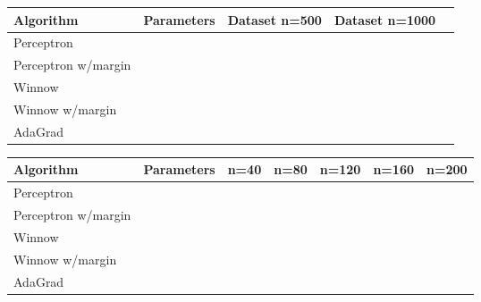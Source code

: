 
\usepackage{amsmath,amssymb,url,color,multirow,array}
\sloppy
\newcommand{\ignore}[1]{}

\oddsidemargin 0in
\evensidemargin 0in
\textwidth 6.5in
\topmargin -0.5in
\textheight 9.0in




  \begin{center}
    \begin{tabular}{|p{3.0cm}|p{2.2cm}|p{2.5cm}|p{2.5cm}|p{2.5cm}|}
      \hline
      Algorithm               &  Parameters & Dataset n=500 & Dataset n=1000\\\hline\hline
      Perceptron              &             &               &      \\\hline
      Perceptron w/margin     &             &               &      \\\hline
      Winnow                  &             &               &      \\\hline
      Winnow w/margin         &             &               &      \\\hline
      AdaGrad                 &             &               &      \\\hline
    \end{tabular}
  \end{center}
  
  \begin{center}
    \begin{tabular}{|p{3.0cm}|p{2.2cm}|p{1cm}|p{1cm}|p{1cm}|p{1cm}|p{1cm}|}
      \hline
      Algorithm             &  Parameters & n=40 & n=80 & n=120 & n=160 & n=200\\\hline\hline
      Perceptron            &             &      &      &       &       &      \\\hline
      Perceptron w/margin   &             &      &      &       &       &      \\\hline
      Winnow                &             &      &      &       &       &      \\\hline
      Winnow w/margin       &             &      &      &       &       &      \\\hline
      AdaGrad               &             &      &      &       &       &      \\\hline
    \end{tabular}
  \end{center}

